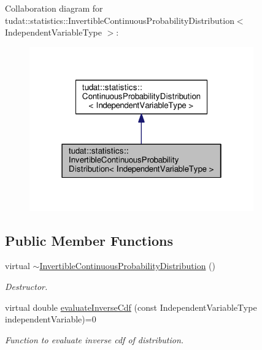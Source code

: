 Collaboration diagram for tudat\+:\+:statistics\+:\+:Invertible\+Continuous\+Probability\+Distribution$<$ Independent\+Variable\+Type $>$\+:
\nopagebreak
\begin{figure}[H]
\begin{center}
\leavevmode
\includegraphics[width=274pt]{classtudat_1_1statistics_1_1InvertibleContinuousProbabilityDistribution__coll__graph}
\end{center}
\end{figure}
\subsection*{Public Member Functions}
\begin{DoxyCompactItemize}
\item 
virtual \hyperlink{classtudat_1_1statistics_1_1InvertibleContinuousProbabilityDistribution_a805f591ad936812ec626c9fbe1dcb2ab}{$\sim$\+Invertible\+Continuous\+Probability\+Distribution} ()\hypertarget{classtudat_1_1statistics_1_1InvertibleContinuousProbabilityDistribution_a805f591ad936812ec626c9fbe1dcb2ab}{}\label{classtudat_1_1statistics_1_1InvertibleContinuousProbabilityDistribution_a805f591ad936812ec626c9fbe1dcb2ab}

\begin{DoxyCompactList}\small\item\em Destructor. \end{DoxyCompactList}\item 
virtual double \hyperlink{classtudat_1_1statistics_1_1InvertibleContinuousProbabilityDistribution_a0c0afc377db1343a9d97c6b8153dbb54}{evaluate\+Inverse\+Cdf} (const Independent\+Variable\+Type independent\+Variable)=0
\begin{DoxyCompactList}\small\item\em Function to evaluate inverse cdf of distribution. \end{DoxyCompactList}\end{DoxyCompactItemize}


